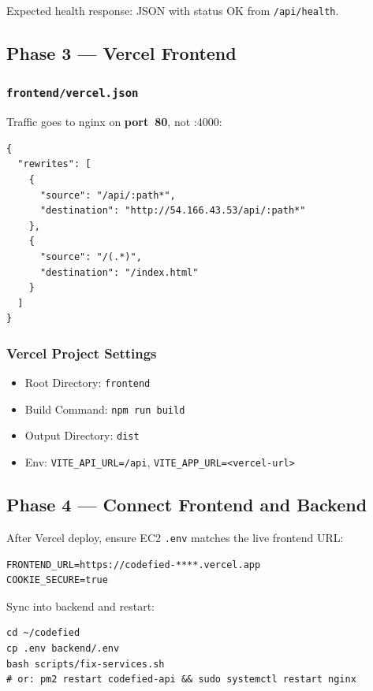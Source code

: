 \documentclass[11pt,a4paper]{article}
\begin{document}
Expected health response: JSON with status OK from \texttt{/api/health}.

\subsection{Phase 3 --- Vercel Frontend}

\subsubsection{\texttt{frontend/vercel.json}}
Traffic goes to nginx on \textbf{port~80}, not :4000:

\begin{lstlisting}[style=envfile]
{
  "rewrites": [
    {
      "source": "/api/:path*",
      "destination": "http://54.166.43.53/api/:path*"
    },
    {
      "source": "/(.*)",
      "destination": "/index.html"
    }
  ]
}
\end{lstlisting}

\subsubsection{Vercel Project Settings}
\begin{itemize}[noitemsep]
  \item Root Directory: \texttt{frontend}
  \item Build Command: \texttt{npm run build}
  \item Output Directory: \texttt{dist}
  \item Env: \texttt{VITE\_API\_URL=/api}, \texttt{VITE\_APP\_URL=<vercel-url>}
\end{itemize}

\subsection{Phase 4 --- Connect Frontend and Backend}
After Vercel deploy, ensure EC2 \texttt{.env} matches the live frontend URL:
\begin{lstlisting}[style=envfile]
FRONTEND_URL=https://codefied-****.vercel.app
COOKIE_SECURE=true
\end{lstlisting}

Sync into backend and restart:
\begin{lstlisting}[style=terminal]
cd ~/codefied
cp .env backend/.env
bash scripts/fix-services.sh
# or: pm2 restart codefied-api && sudo systemctl restart nginx
\end{lstlisting}
\end{document}
